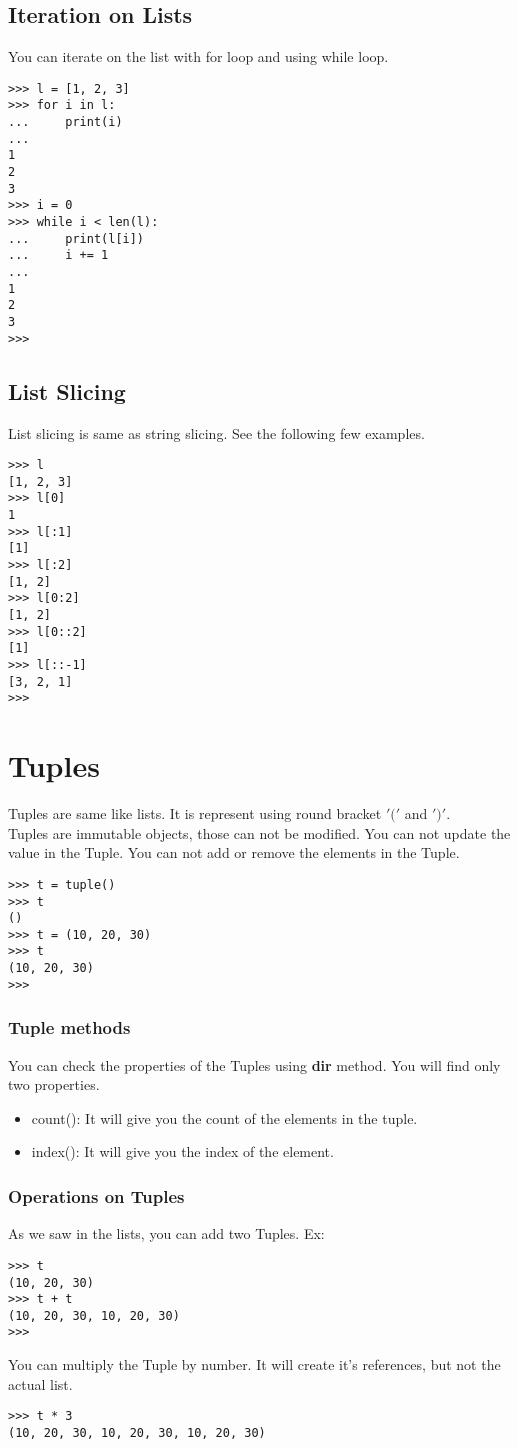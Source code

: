 \documentclass[letterpaper,12pt]{book}
\begin{document}
\subsection{Iteration on Lists}
You can iterate on the list with for loop and using while loop.
\begin{lstlisting}
>>> l = [1, 2, 3]
>>> for i in l:
...     print(i)
... 
1
2
3
>>> i = 0
>>> while i < len(l):
...     print(l[i])
...     i += 1
... 
1
2
3
>>>
\end{lstlisting}
\subsection{List Slicing}
List slicing is same as string slicing. See the following few examples.
\begin{lstlisting}
>>> l
[1, 2, 3]
>>> l[0]
1
>>> l[:1]
[1]
>>> l[:2]
[1, 2]
>>> l[0:2]
[1, 2]
>>> l[0::2]
[1]
>>> l[::-1]
[3, 2, 1]
>>> 
\end{lstlisting}

\section{Tuples}
Tuples are same like lists. It is represent using round bracket $'('$ and $')'$.\\
Tuples are immutable objects, those can not be modified.
You can not update the value in the Tuple.
You can not add or remove the elements in the Tuple.
\begin{lstlisting}
>>> t = tuple()
>>> t
()
>>> t = (10, 20, 30)
>>> t
(10, 20, 30)
>>>
\end{lstlisting}
\subsubsection{Tuple methods}
You can check the properties of the Tuples using \textbf{dir} method. You will find only two properties.
\begin{itemize}
\item count(): It will give you the count of the elements in the tuple.
\item index(): It will give you the index of the element.
\end{itemize}
\subsubsection{Operations on Tuples}
As we saw in the lists, you can add two Tuples. Ex:
\begin{lstlisting}
>>> t
(10, 20, 30)
>>> t + t
(10, 20, 30, 10, 20, 30)
>>>
\end{lstlisting}
You can multiply the Tuple by number. It will create it's references, but not the actual list.
\begin{lstlisting}
>>> t * 3
(10, 20, 30, 10, 20, 30, 10, 20, 30)
\end{lstlisting}
\end{document}
